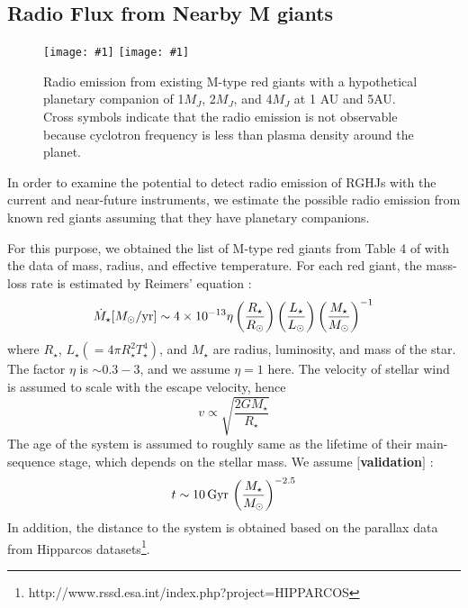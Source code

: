 \documentclass{emulateapj}
\def\memoYF#1{\color{red}$[${\bf #1}$]$ \color{black}}
\def\plotoneh#1{\centering \leavevmode
\texttt{[image: \#1]}}
\begin{document}
\subsection{Radio Flux from Nearby M giants}
\label{ss:actualMgiants}

\begin{figure}[tbhp]
   \plotoneh{radio_1Mp.pdf}
   \plotoneh{radio_10Mp.pdf}
   \caption{Radio emission from existing M-type red giants with a hypothetical planetary companion of 1$M_J$, 2$M_J$, and 4$M_J$ at 1 AU and 5AU. Cross symbols indicate that the radio emission is not observable because cyclotron frequency is less than plasma density around the planet. }
  \label{fig:observability}
\end{figure}

In order to examine the potential to detect radio emission of RGHJs with the current and near-future instruments, we estimate the possible radio emission from known red giants assuming that they have planetary companions. 

For this purpose, we obtained the list of M-type red giants from Table 4 of \citet{dumm1998} with the data of mass, radius, and effective temperature.
For each red giant, the mass-loss rate is estimated by Reimers' equation \citep{reimers1975}:
\begin{equation}
\dot M_\star [M_\odot{\rm /yr}] \sim 4 \times 10^{-13} \eta \left( \frac{R_{\star }}{R_{\odot }} \right)\left( \frac{L_{\star }}{L_{\odot }} \right) \left( \frac{M_\star}{M_\odot} \right)^{-1}
\end{equation}
where $R_{\star }$, $L_{\star } (=4\pi R_{\star }^2 T_{\star }^4)$, and $M_{\star}$ are radius, luminosity, and mass of the star. 
The factor $\eta $ is $\sim 0.3-3$, and we assume $\eta =1$ here. 
The velocity of stellar wind is assumed to scale with the escape velocity, hence
\begin{equation}
v \propto \sqrt{\frac{2GM_\star}{R_{\star }}}
\end{equation}
The age of the system is assumed to roughly same as the lifetime of their main-sequence stage, which depends on the stellar mass. We assume \memoYF{validation}:
\begin{equation}
t \sim 10\,{\rm Gyr}\, \left( \frac{M_{\star}}{M_{\odot }} \right)^{-2.5}
\end{equation}
In addition, the distance to the system is obtained based on the parallax data from Hipparcos datasets\footnote{http://www.rssd.esa.int/index.php?project=HIPPARCOS}. 
\end{document}

